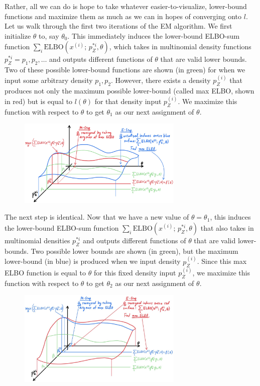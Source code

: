  Rather, all we can do is hope to take whatever easier-to-visualize, lower-bound functions and maximize them as much as we can in hopes of converging onto $l$. Let us walk through the first two iterations of the EM algorithm. We first initialize $\theta$ to, say $\theta_0$. This immediately induces the lower-bound ELBO-sum function $\sum_{i} \text{ELBO} (x^{(i)};\, p_Z^{*i}, \theta)$, which takes in multinomial density functions $p_Z^{*i} = p_1, p_2, \ldots$ and outputs different functions of $\theta$ that are valid lower bounds. Two of these possible lower-bound functions are shown (in green) for when we input some arbitrary density $p_1, p_2$. However, there exists a density $p_Z^{(i)}$ that produces not only the maximum possible lower-bound (called max ELBO, shown in red) but is equal to $l(\theta)$ for that density input $p_Z^{(i)}$. We maximize this function with respect to $\theta$ to get $\theta_1$ as our next assignment of $\theta$. 

  \begin{figure}[H]
    \centering 
    \includegraphics[width=0.7\textwidth]{img/EM_first_iteration.jpg}
    \caption{} 
    \label{fig:EM_first_iteration}
  \end{figure}

  The next step is identical. Now that we have a new value of $\theta = \theta_1$, this induces the lower-bound ELBO-sum function $\sum_{i} \text{ELBO} (x^{(i)};\, p_Z^{*i}, \theta)$ that also takes in multinomial densities $p_Z^{*i}$ and outputs different functions of $\theta$ that are valid lower-bounds. Two possible lower bounds are shown (in green), but the maximum lower-bound (in blue) is produced when we input density $p_Z^{(i)}$. Since this max ELBO function is equal to $\theta$ for this fixed density input $p_Z^{(i)}$, we maximize this function with respect to $\theta$ to get $\theta_2$ as our next assignment of $\theta$. 

  \begin{figure}[H]
    \centering 
    \includegraphics[width=0.7\textwidth]{img/EM_second_iteration.jpg}
    \caption{} 
    \label{fig:EM_second_iteration}
  \end{figure}

